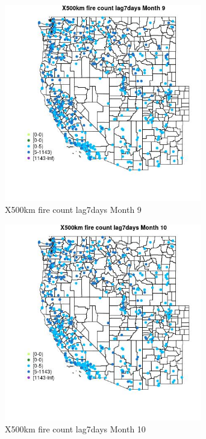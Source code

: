\begin{figure} 
\centering  
\includegraphics[width=0.77\textwidth]{Code_Outputs/Report_ML_input_PM25_Step4_part_e_de_duplicated_aves_compiled_2019-05-14wNAs_MapObsMo9X500km_fire_count_lag7days.jpg} 
\caption{\label{fig:Report_ML_input_PM25_Step4_part_e_de_duplicated_aves_compiled_2019-05-14wNAsMapObsMo9X500km_fire_count_lag7days}X500km fire count lag7days Month 9} 
\end{figure} 
 

\begin{figure} 
\centering  
\includegraphics[width=0.77\textwidth]{Code_Outputs/Report_ML_input_PM25_Step4_part_e_de_duplicated_aves_compiled_2019-05-14wNAs_MapObsMo10X500km_fire_count_lag7days.jpg} 
\caption{\label{fig:Report_ML_input_PM25_Step4_part_e_de_duplicated_aves_compiled_2019-05-14wNAsMapObsMo10X500km_fire_count_lag7days}X500km fire count lag7days Month 10} 
\end{figure} 
 

